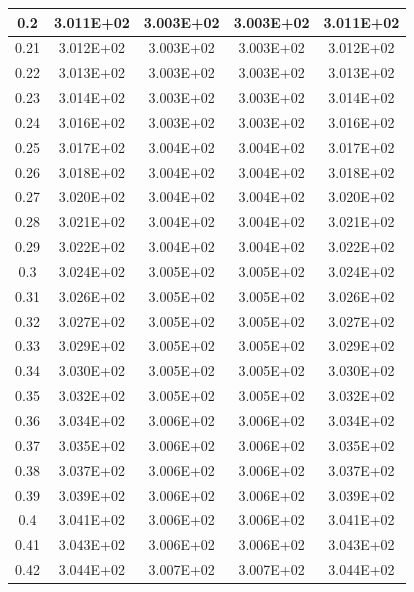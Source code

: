 \documentclass{article}
\begin{document}
\begin{center}
\begin{longtable}{|c|c|c|c|c|}
            0.2 & 3.011E+02 & 3.003E+02 & 3.003E+02 & 3.011E+02 \\ \hline
            0.21 & 3.012E+02 & 3.003E+02 & 3.003E+02 & 3.012E+02 \\ \hline
            0.22 & 3.013E+02 & 3.003E+02 & 3.003E+02 & 3.013E+02 \\ \hline
            0.23 & 3.014E+02 & 3.003E+02 & 3.003E+02 & 3.014E+02 \\ \hline
            0.24 & 3.016E+02 & 3.003E+02 & 3.003E+02 & 3.016E+02 \\ \hline
            0.25 & 3.017E+02 & 3.004E+02 & 3.004E+02 & 3.017E+02 \\ \hline
            0.26 & 3.018E+02 & 3.004E+02 & 3.004E+02 & 3.018E+02 \\ \hline
            0.27 & 3.020E+02 & 3.004E+02 & 3.004E+02 & 3.020E+02 \\ \hline
            0.28 & 3.021E+02 & 3.004E+02 & 3.004E+02 & 3.021E+02 \\ \hline
            0.29 & 3.022E+02 & 3.004E+02 & 3.004E+02 & 3.022E+02 \\ \hline
            0.3 & 3.024E+02 & 3.005E+02 & 3.005E+02 & 3.024E+02 \\ \hline
            0.31 & 3.026E+02 & 3.005E+02 & 3.005E+02 & 3.026E+02 \\ \hline
            0.32 & 3.027E+02 & 3.005E+02 & 3.005E+02 & 3.027E+02 \\ \hline
            0.33 & 3.029E+02 & 3.005E+02 & 3.005E+02 & 3.029E+02 \\ \hline
            0.34 & 3.030E+02 & 3.005E+02 & 3.005E+02 & 3.030E+02 \\ \hline
            0.35 & 3.032E+02 & 3.005E+02 & 3.005E+02 & 3.032E+02 \\ \hline
            0.36 & 3.034E+02 & 3.006E+02 & 3.006E+02 & 3.034E+02 \\ \hline
            0.37 & 3.035E+02 & 3.006E+02 & 3.006E+02 & 3.035E+02 \\ \hline
            0.38 & 3.037E+02 & 3.006E+02 & 3.006E+02 & 3.037E+02 \\ \hline
            0.39 & 3.039E+02 & 3.006E+02 & 3.006E+02 & 3.039E+02 \\ \hline
            0.4 & 3.041E+02 & 3.006E+02 & 3.006E+02 & 3.041E+02 \\ \hline
            0.41 & 3.043E+02 & 3.006E+02 & 3.006E+02 & 3.043E+02 \\ \hline
            0.42 & 3.044E+02 & 3.007E+02 & 3.007E+02 & 3.044E+02 \\ \hline

\end{longtable}
\end{center}
\end{document}
